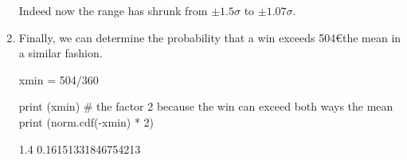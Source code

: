 \begin{solution}
\begin{enumerate}[label={\emph{\alph*})}]
Indeed now the range has shrunk from $\pm1.5\sigma$ to $\pm1.07\sigma$. 

\item Finally, we can determine the probability that a win exceeds 504\euro the mean in a similar fashion.

\begin{ipython}
xmin = 504/360

print (xmin)
# the factor 2 because the win can exceed both ways the mean
print (norm.cdf(-xmin) * 2)
\end{ipython}
\begin{ioutput}
1.4
0.16151331846754213
\end{ioutput}
\end{enumerate}
\end{solution}

